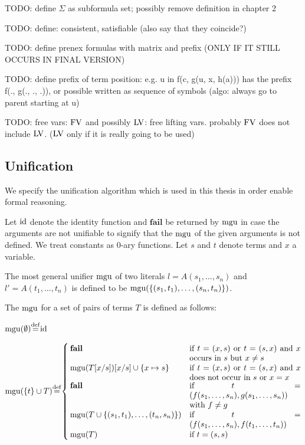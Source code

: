 TODO: define $\Sigma$ as subformula set; possibly remove definition in chapter 2

TODO: define: consistent, satisfiable (also say that they coincide?)


TODO: define prenex formulas with matrix and prefix (ONLY IF IT STILL OCCURS IN FINAL VERSION)

TODO: define prefix of term position: e.g. u in f(c, g(u, x, h(a))) has the prefix f(., g(., ., .)), or possible written as sequence of symbols (algo: always go to parent starting at u)

TODO: free vars: $\operatorname{FV}$ and possibly $\operatorname{LV}$: free lifting vars. probably $\operatorname{FV}$ does not include $\operatorname{LV}$. ($\operatorname{LV}$ only if it is really going to be used)


\subsection{Unification}

We specify the unification algorithm which is used in this thesis in order enable formal reasoning.

	Let $\operatorname{id}$ denote the identity function and $\textbf{fail}$ be returned by $\operatorname{mgu}$ in case the arguments are not unifiable to signify that the $\operatorname{mgu}$ of the given arguments is not defined. We treat constants as $0$-ary functions.
	Let $s$ and $t$ denote terms and $x$ a variable.

	The most general unifier $\operatorname{mgu}$ of two literals $l = A(s_1,\dotsc, s_n)$ and $l' = A(t_1,\dots, t_n)$ is defined to be $\operatorname{mgu}(\{ (s_1, t_1), \dotsc, (s_n, t_n)\})$.


	The $\operatorname{mgu}$ for a set of pairs of terms $T$ is defined as follows:

	\noindent
	$
	\mgu(\emptyset) \defeq \id
	$

	\newcommand{\aatahfdgasdfg}{.4\textwidth}
	\noindent
	$
	\mbox{$\mgu(\{t\} \cup T)$} \defeq
	\begin{cases}
		\mathbf{fail} 				& \parbox[t]{\aatahfdgasdfg}{if $t = (x, s)$ or $t=(s,x)$ and $x$ occurs in $s$ but $x\neq s$ } \\
		\mgu(T\subst{x/s})\subst{x/s} \cup \{x\mapsto s\} 		& \parbox[t]{\aatahfdgasdfg}{if $t = (x, s)$ or $t=(s,x)$ and $x$ does not occur in $s$ or $x=x$} \\
		\mathbf{fail} 				& \parbox[t]{\aatahfdgasdfg}{if $t = (f(s_1,\dotsc,s_n), g(s_1,\dotsc,s_n))$ with $f\neq g$} \\
		\mgu(T \cup \{(s_1, t_1), \dotsc, (t_n, s_n)\})		& \parbox[t]{\aatahfdgasdfg}{if $t = (f(s_1,\dotsc,s_n), f(t_1,\dotsc,t_n))$} \\
		\mgu(T) 							& \text{if $t=(s, s)$} \\
	\end{cases}
	$

